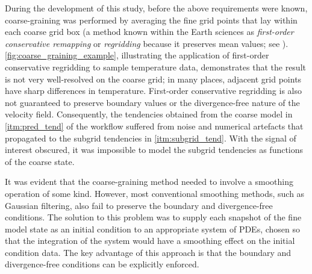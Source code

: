 \documentclass[../main.tex]{subfiles}
\begin{document}
During the development of this study, before the above requirements were known,
coarse-graining was performed by averaging the fine grid points that lay within
each coarse grid box (a method known within the Earth sciences as
\emph{first-order conservative remapping} or \emph{regridding} because it
preserves mean values; see \cite{jones1999}).
\cref{fig:coarse_graining_example}, illustrating the application of first-order
conservative regridding to sample temperature data, demonstrates that the
result is not very well-resolved on the coarse grid; in many places, adjacent
grid points have sharp differences in temperature. First-order conservative
regridding is also not guaranteed to preserve boundary values or the
divergence-free nature of the velocity field. Consequently, the tendencies
obtained from the coarse model in \cref{itm:pred_tend} of the workflow suffered
from noise and numerical artefacts that propagated to the subgrid tendencies in
\cref{itm:subgrid_tend}. With the signal of interest obscured, it was
impossible to model the subgrid tendencies as functions of the coarse state.

It was evident that the coarse-graining method needed to involve a smoothing
operation of some kind. However, most conventional smoothing methods, such as
Gaussian filtering, also fail to preserve the boundary and divergence-free
conditions. The solution to this problem was to supply each snapshot of the
fine model state as an initial condition to an appropriate system of PDEs,
chosen so that the integration of the system would have a smoothing effect on
the initial condition data. The key advantage of this approach is that the
boundary and divergence-free conditions can be explicitly enforced.
\end{document}
